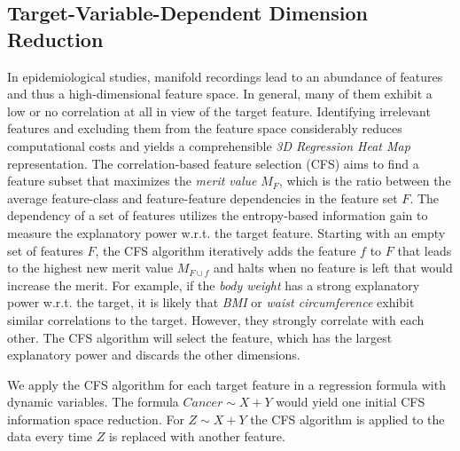\documentclass[journal]{style/vgtc} 			          %
\begin{document}
\subsection{Target-Variable-Dependent Dimension Reduction}
In epidemiological studies, manifold recordings lead to an abundance of features and thus a high-dimensional feature space.
In general, many of them exhibit a low or no correlation at all in view of the target feature.
Identifying irrelevant features and excluding them from the feature space considerably reduces computational costs and yields a comprehensible \emph{3D Regression Heat Map} representation.
The correlation-based feature selection (CFS) \cite{CFS} aims to find a feature subset that maximizes the \emph{merit value} $M_F$, which is the ratio between the average feature-class and feature-feature dependencies in the feature set $F$.
The dependency of a set of features utilizes the entropy-based information gain to measure the explanatory power w.r.t. the target feature.
Starting with an empty set of features $F$, the CFS algorithm iteratively adds the feature $f$ to $F$ that leads to the highest new merit value $M_{F\cup f}$ and halts when no feature is left that would increase the merit.
For example, if the \emph{body weight} has a strong explanatory power w.r.t. the target, it is likely that \emph{BMI} or \emph{waist circumference} exhibit similar correlations to the target.
However, they strongly correlate with each other.
The CFS algorithm will select the feature, which has the largest explanatory power and discards the other dimensions.

We apply the CFS algorithm for each target feature in a regression formula with dynamic variables.
The formula $Cancer \sim X + Y$ would yield one initial CFS information space reduction.
For $Z \sim X + Y$ the CFS algorithm is applied to the data every time $Z$ is replaced with another feature.
\end{document}
